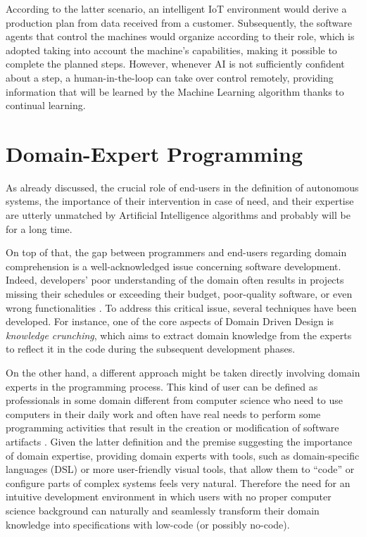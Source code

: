 \begin{itemize}
    According to the latter scenario, an intelligent IoT environment would derive a production plan from data received from a customer.
    Subsequently, the software agents that control the machines would organize according to their role, which is adopted taking into account the machine's capabilities, making it possible to complete the planned steps.
    However, whenever AI is not sufficiently confident about a step, a human-in-the-loop can take over control remotely, providing information that will be learned by the Machine Learning algorithm thanks to continual learning.
\end{itemize}

\section{Domain-Expert Programming}
As already discussed, the crucial role of end-users in the definition of autonomous systems, the importance of their intervention in case of need, and their expertise are utterly unmatched by Artificial Intelligence algorithms and probably will be for a long time.

On top of that, the gap between programmers and end-users regarding domain comprehension is a well-acknowledged issue concerning software development.
Indeed, developers' poor understanding of the domain often results in projects missing their schedules or exceeding their budget, poor-quality software, or even wrong functionalities \cite{5089292}.
To address this critical issue, several techniques have been developed.
For instance, one of the core aspects of Domain Driven Design is \textit{knowledge crunching}, which aims to extract domain knowledge from the experts to reflect it in the code during the subsequent development phases.

On the other hand, a different approach might be taken directly involving domain experts in the programming process.
This kind of user can be defined as professionals in some domain different from computer science who need to use computers in their daily work and often have real needs to perform some programming activities that result in the creation or modification of software artifacts \cite{costabile2003domain}.
Given the latter definition and the premise suggesting the importance of domain expertise, providing domain experts with tools, such as domain-specific languages (DSL) or more user-friendly visual tools, that allow them to ``code'' or configure parts of complex systems feels very natural.
Therefore the need for an intuitive development environment in which users with no proper computer science background can naturally and seamlessly transform their domain knowledge into specifications with low-code (or possibly no-code).

